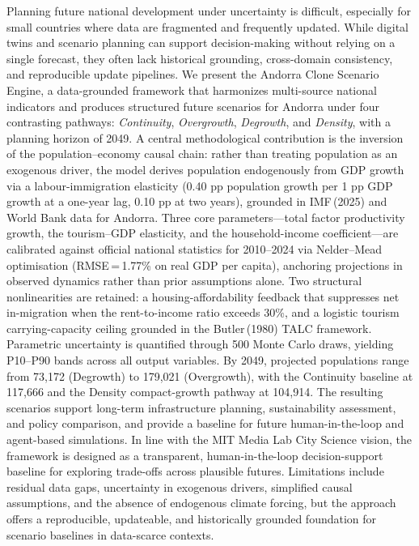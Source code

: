 \documentclass{article}
\begin{document}
Planning future national development under uncertainty is difficult, especially
for small countries where data are fragmented and frequently updated. While
digital twins and scenario planning can support decision-making without relying
on a single forecast, they often lack historical grounding, cross-domain
consistency, and reproducible update pipelines. We present the Andorra Clone
Scenario Engine, a data-grounded framework that harmonizes multi-source national
indicators and produces structured future scenarios for Andorra under four
contrasting pathways: \textit{Continuity}, \textit{Overgrowth},
\textit{Degrowth}, and \textit{Density}, with a planning horizon of 2049.
A central methodological contribution is the inversion of the population--economy
causal chain: rather than treating population as an exogenous driver, the model
derives population endogenously from GDP growth via a labour-immigration
elasticity (0.40 pp population growth per 1 pp GDP growth at a one-year lag,
0.10 pp at two years), grounded in IMF\,(2025) and World Bank data for Andorra.
Three core parameters---total factor productivity growth, the tourism--GDP
elasticity, and the household-income coefficient---are calibrated against
official national statistics for 2010--2024 via Nelder--Mead optimisation
(RMSE\,=\,1.77\% on real GDP per capita), anchoring projections in observed
dynamics rather than prior assumptions alone.
Two structural nonlinearities are retained: a housing-affordability feedback
that suppresses net in-migration when the rent-to-income ratio exceeds 30\%, and
a logistic tourism carrying-capacity ceiling grounded in the Butler\,(1980) TALC
framework. Parametric uncertainty
is quantified through 500 Monte Carlo draws, yielding P10--P90 bands across all
output variables. By 2049, projected populations range from 73{,}172 (Degrowth)
to 179{,}021 (Overgrowth), with the Continuity baseline at 117{,}666 and the
Density compact-growth pathway at 104{,}914. The resulting scenarios support
long-term infrastructure planning, sustainability assessment, and policy
comparison, and provide a baseline for future human-in-the-loop and agent-based
simulations. In line with the MIT Media Lab City Science vision, the framework
is designed as a transparent, human-in-the-loop decision-support baseline for
exploring trade-offs across plausible futures. Limitations include residual data
gaps, uncertainty in exogenous drivers, simplified causal assumptions, and the
absence of endogenous climate forcing, but the approach offers a reproducible,
updateable, and historically grounded foundation for scenario baselines in
data-scarce contexts.
\end{document}
